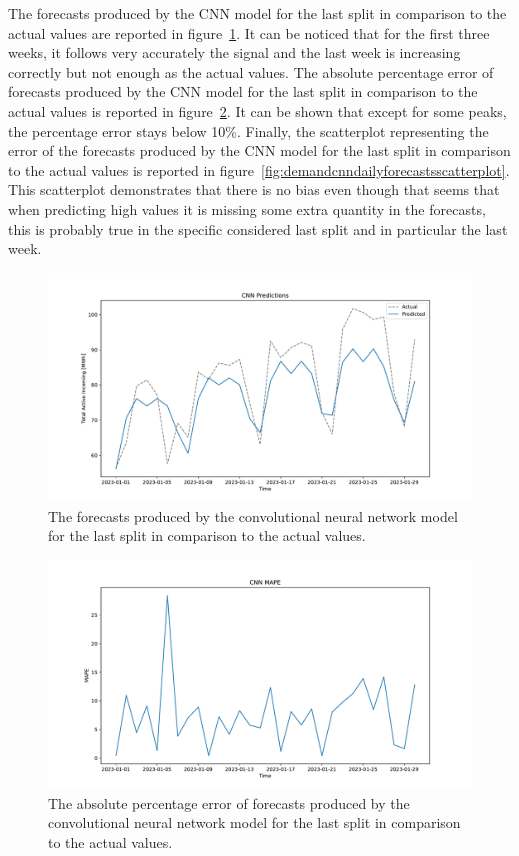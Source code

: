 The forecasts produced by the CNN model for the last split in comparison to the actual values are reported in figure~\ref{fig:demandcnndailyforecasts}.
It can be noticed that for the first three weeks, it follows very accurately the signal and the last week is increasing correctly but not enough as the actual values.
The absolute percentage error of forecasts produced by the CNN model for the last split in comparison to the actual values is reported in figure~\ref{fig:demandcnndailyforecastsmape}.
It can be shown that except for some peaks, the percentage error stays below 10\%.
Finally, the scatterplot representing the error of the forecasts produced by the CNN model for the last split in comparison to the actual values is reported in figure~\ref{fig:demandcnndailyforecastsscatterplot}.
This scatterplot demonstrates that there is no bias even though that seems that when predicting high values it is missing some extra quantity in the forecasts, this is probably true in the specific considered last split and in particular the last week.

\begin{figure}[H]
\centering
\includegraphics[width=1\textwidth]{images/demand/CNN_daily_aggregated}
\caption{The forecasts produced by the convolutional neural network model for the last split in comparison to the actual values.}
\label{fig:demandcnndailyforecasts}
\end{figure}

\begin{figure}[H]
\centering
\includegraphics[width=1\textwidth]{images/demand/CNN_daily_aggregated_mape}
\caption{The absolute percentage error of forecasts produced by the convolutional neural network model for the last split in comparison to the actual values.}
\label{fig:demandcnndailyforecastsmape}
\end{figure}

